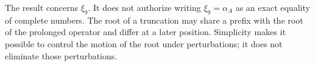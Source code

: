 The result concerns \(\xi_9\). It does not authorize writing
\(\xi_9=\alpha_A\) as an exact equality of complete numbers. The root of a
truncation may share a prefix with the root of the prolonged operator and
differ at a later position. Simplicity makes it possible to control the
motion of the root under perturbations; it does not eliminate those
perturbations.


